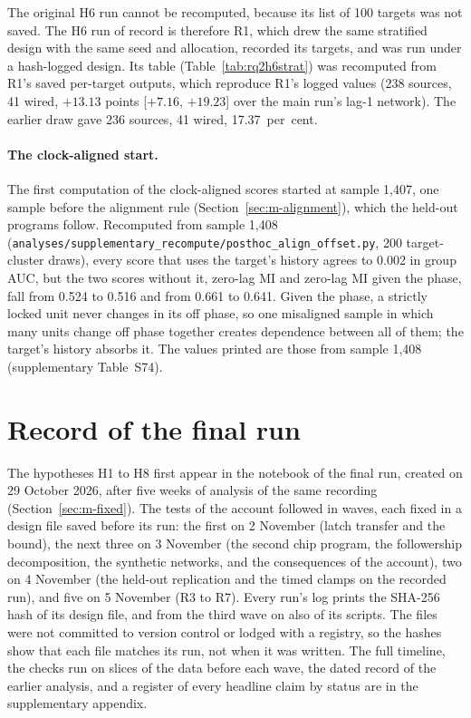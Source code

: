 The original H6 run cannot be recomputed, because its list of 100 targets was not saved. The H6 run of record is therefore R1, which drew the same stratified design with the same seed and allocation, recorded its targets, and was run under a hash-logged design. Its table (Table~\ref{tab:rq2h6strat}) was recomputed from R1's saved per-target outputs, which reproduce R1's logged values (238 sources, 41 wired, $+13.13$ points [$+7.16$, $+19.23$] over the main run's lag-1 network). The earlier draw gave 236 sources, 41 wired, 17.37~per~cent.

\paragraph{The clock-aligned start.} The first computation of the clock-aligned scores started at sample 1,407, one sample before the alignment rule (Section~\ref{sec:m-alignment}), which the held-out programs follow. Recomputed from sample 1,408 (\texttt{analyses/supplementary\_recompute/posthoc\_align\_offset.py}, 200 target-cluster draws), every score that uses the target's history agrees to 0.002 in group AUC, but the two scores without it, zero-lag MI and zero-lag MI given the phase, fall from 0.524 to 0.516 and from 0.661 to 0.641. Given the phase, a strictly locked unit never changes in its off phase, so one misaligned sample in which many units change off phase together creates dependence between all of them; the target's history absorbs it. The values printed are those from sample 1,408 (supplementary Table~S74).

\section{Record of the final run}
\suppressfloats[t]
\label{app:c4-run}

The hypotheses H1 to H8 first appear in the notebook of the final run, created on 29 October 2026, after five weeks of analysis of the same recording (Section~\ref{sec:m-fixed}). The tests of the account followed in waves, each fixed in a design file saved before its run: the first on 2 November (latch transfer and the bound), the next three on 3 November (the second chip program, the followership decomposition, the synthetic networks, and the consequences of the account), two on 4 November (the held-out replication and the timed clamps on the recorded run), and five on 5 November (R3 to R7). Every run's log prints the SHA-256 hash of its design file, and from the third wave on also of its scripts. The files were not committed to version control or lodged with a registry, so the hashes show that each file matches its run, not when it was written. The full timeline, the checks run on slices of the data before each wave, the dated record of the earlier analysis, and a register of every headline claim by status are in the supplementary appendix.

\clearpage
